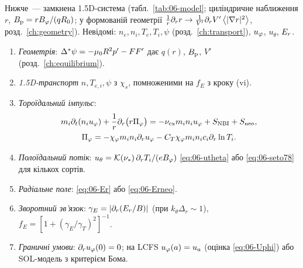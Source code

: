 Нижче~--- замкнена 1.5D-система (табл.~\ref{tab:06-model}; циліндричне наближення $r$, $B_{\mathrm{p}}=rB_{\varphi}/(qR_0)$; у формованій геометрії $\frac1r\partial_r r\to\frac{1}{V'}\partial_rV'\left\langle |\nabla r|^2 \right\rangle$, розд.~\ref{ch:geometry}). Невідомі: $n_e,n_i,T_e,T_i,\psi$ (розд.~\ref{ch:transport}), $u_{\varphi}$, $u_\theta$, $E_{r}$.
\begin{enumerate}[label=(\roman*)]
\item \emph{Геометрія}: $\Delta^{*}\psi=-\mu_0R^2p'-FF'$ дає $q(r)$, $B_{\mathrm{p}}$, $V'$ (розд.~\ref{ch:equilibrium}).
\item \emph{1.5D-транспорт} $n,T_{e,i},\psi$ з $\chi_s$, помноженими на $f_E$ з кроку (vi).
\item \emph{Тороїдальний імпульс}:
\begin{equation}\label{eq:06-model-mom}
  \begin{gathered}
  m_i\partial_t(n_iu_{\varphi})+\frac1r\partial_r\bigl(r\Pi_{\varphi}\bigr)=-\nu_{\mathrm{cx}}m_in_iu_{\varphi}+S_{\mathrm{NBI}}+S_{\mathrm{neo}},\\
  \Pi_{\varphi}=-\chi_{\varphi}m_in_i\partial_ru_{\varphi}-C_T\chi_{\varphi}m_in_ic_i\partial_r\ln T_i .
  \end{gathered}
\end{equation}
\item \emph{Полоїдальний потік}: $u_\theta=\mathcal{K}(\nu_{*})\,\partial_rT_i/(eB_{\varphi})$ \eqref{eq:06-utheta} або \eqref{eq:06-seto78} для кількох сортів.
\item \emph{Радіальне поле}: \eqref{eq:06-Er} або \eqref{eq:06-Erneo}.
\item \emph{Зворотний зв'язок}: $\gamma_E=|\partial_r(E_{r}/B)|$ (при $k_\theta\Delta_r\sim1$), $f_E=[1+(\gamma_E/\gamma_T)^2]^{-1}$.
\item \emph{Граничні умови}: $\partial_ru_{\varphi}(0)=0$; на LCFS $u_{\varphi}(a)=u_a$ (оцінка \eqref{eq:06-Uphi}) або SOL-модель з критерієм Бома.
\end{enumerate}

